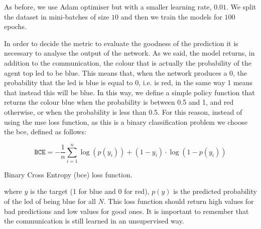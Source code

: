 As before, we use Adam optimiser but with a smaller learning rate, $0.01$. 
We split the dataset in mini-batches of size $10$ and then we train the models for 
$100$ epochs. 

In order to decide the metric to evaluate the goodness of the prediction it is 
necessary to analyse the output of the network. As we said, the model returns, in 
addition to the communication, the colour that is actually the probability of the 
agent top \gls{led} to be blue. This means that, when the network produces a 0, 
the probability that the \gls{led} is blue is equal to 0, i.e. is red, in the same way 1 
means that instead this will be blue. In this way, we define a simple policy function 
that returns the colour blue when the probability is between 0.5 and 1, and red 
otherwise, or when the probability is less than 0.5.
For this reason, instead of using the \gls{mse} loss function, as this is a binary 
classification problem we choose the \gls{bce}, defined as follows:
\begin{Equation}[H]
	\centering
	\begin{equation}
	\mathtt{BCE} = -\frac{1}{n} \sum_{i=1}^n \log(p(y_i)) + (1-y_i) \cdot \log(1 - 
	p(y_i))
	\end{equation}
	\caption{Binary Cross Entropy (\gls{bce}) loss function.}
	\label{eq:bce}
\end{Equation}
where $y$ is the target (1 for blue and 0 for red), $p(y)$ is the predicted 
probability of the \gls{led} of being blue for all $N$.
This loss function should return high values for bad predictions and low values for 
good ones.
It is important to remember that the communication is still learned in an 
unsupervised way.


